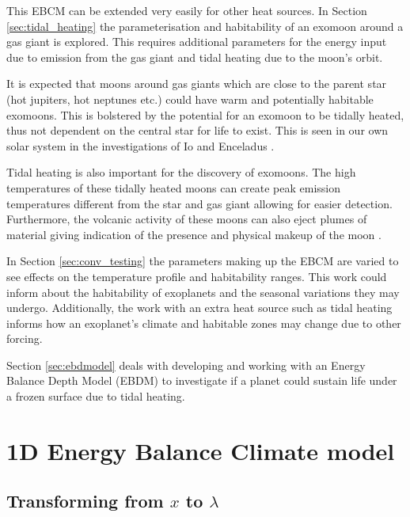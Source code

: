 \documentclass[12pt, onecolumn]{revtex4-2}    %
\begin{document}
This EBCM can be extended very easily for other heat sources.
In Section \ref{sec:tidal_heating} the parameterisation and habitability of an exomoon around a gas giant is explored.
This requires additional parameters for the energy input due to emission from the gas giant and tidal heating due to the moon's orbit.

It is expected that moons around gas giants which are close to the parent star (hot jupiters, hot neptunes etc.) could have warm and potentially habitable exomoons.
This is bolstered by the potential for an exomoon to be tidally heated, thus not dependent on the central star for life to exist.
This is seen in our own solar system in the investigations of Io and Enceladus \cite{SAB22}.

Tidal heating is also important for the discovery of exomoons.
The high temperatures of these tidally heated moons can create peak emission temperatures different from the star and gas giant allowing for easier detection.
Furthermore, the volcanic activity of these moons can also eject plumes of material giving indication of the presence and physical makeup of the moon \cite{RN21}.


In Section \ref{sec:conv_testing} the parameters making up the EBCM are varied to see effects on the temperature profile and habitability ranges.
This work could inform about the habitability of exoplanets and the seasonal variations they may undergo.
Additionally, the work with an extra heat source such as tidal heating informs how an exoplanet's climate and habitable zones may change due to other forcing.

Section \ref{sec:ebdmodel} deals with developing and working with an Energy Balance Depth Model (EBDM) to investigate if a planet could sustain life under a frozen surface due to tidal heating.

\section{1D Energy Balance Climate model} \label{sec:ebcmodel}

\subsection{Transforming from $x$ to $\lambda$} \label{ssec:transxlambda}
\end{document}
